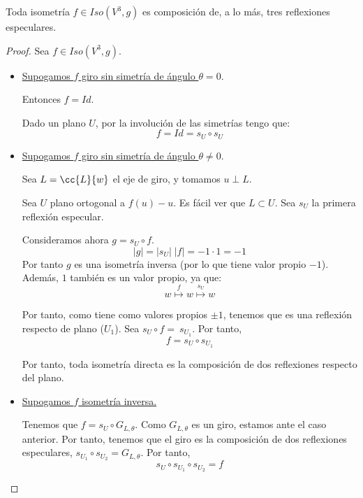 \begin{teo}
    Toda isometría $f\in Iso(V^3, g)$ es composición de, a lo más, tres reflexiones especulares.
\end{teo}

\begin{proof}
    Sea $f\in Iso(V^3, g)$.

    \begin{itemize}
        \item \underline{Supogamos $f$ giro sin simetría de ángulo $\theta = 0$}.

        Entonces $f=Id$.

        Dado un plano $U$, por la involución de las simetrías tengo que:
        \begin{equation*}
            f=Id = s_U \circ s_U
        \end{equation*}

        \item \underline{Supogamos $f$ giro sin simetría de ángulo $\theta \neq 0$}.

        Sea $L=\cc{L}\{w\}$ el eje de giro, y tomamos $u\perp L$.
        
        Sea $U$ plano ortogonal a $f(u)-u$. Es fácil ver que $L\subset U$. Sea $s_U$ la primera reflexión especular.

        Consideramos ahora $g=s_U\circ f$.
        \begin{equation*}
            |g| = |s_U|\;|f| = -1\cdot 1 = -1
        \end{equation*}
        Por tanto $g$ es una isometría inversa (por lo que tiene valor propio $-1$). Además, $1$ también es un valor propio, ya que:
        \begin{equation*}
            w \stackrel{f}{\longmapsto} w \stackrel{s_U}{\longmapsto} w
        \end{equation*}

        Por tanto, como tiene como valores propios $\pm 1$, tenemos que es una reflexión respecto de plano ($U_1$). Sea $s_U\circ f=~s_{U_1}$. Por tanto,
        \begin{equation*}
            f=s_U \circ s_{U_1}
        \end{equation*}

        Por tanto, toda isometría directa es la composición de dos reflexiones respecto del plano.

        \item \underline{Supogamos $f$ isometría inversa.}

        Tenemos que $f=s_U\circ G_{L,\theta}$. Como $G_{L,\theta}$ es un giro, estamos ante el caso anterior. Por tanto, tenemos que el giro es la composición de dos reflexiones especulares, $s_{U_1}\circ s_{U_2}=G_{L,\theta}$. Por tanto,
        \begin{equation*}
            s_U\circ s_{U_1}\circ s_{U_2} = f
        \end{equation*}
        
    \end{itemize}
\end{proof}


